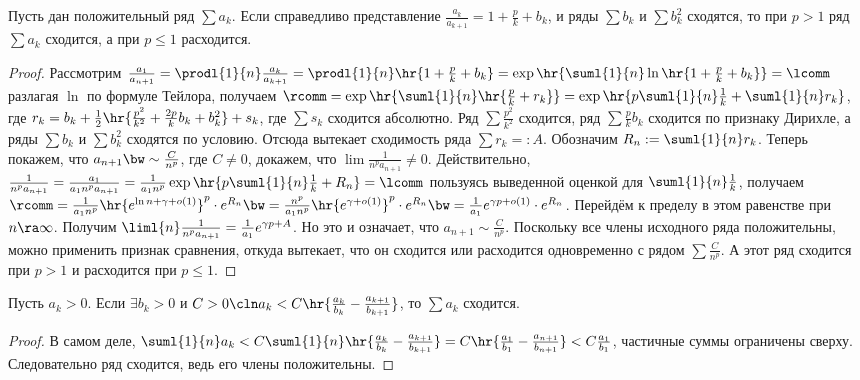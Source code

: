 \documentclass[a4paper]{article}
\begin{document}
\begin{theorem}
Пусть дан положительный ряд $\sum a_k$. Если справедливо представление $\frac{a_k}{a_{k+1}}=1+\frac{p}{k} + b_k$,
и ряды $\sum b_k$ и $\sum b_k^2$ сходятся, то при $p > 1$ ряд $\sum a_k$ сходится, а при $p \le 1$ расходится.
\end{theorem}
\begin{proof}
Рассмотрим $\frac{a_1}{a_{n+1}}= \prodl{1}{n} \frac{a_k}{a_{k+1}} = \prodl{1}{n}\hr{ 1+\frac{p}{k} + b_k } =
\exp \hr{ \suml{1}{n} \ln \hr{ 1 + \frac{p}{k} + b_k }} = \lcomm$ разлагая $\ln$ по формуле Тейлора, получаем $\rcomm =
\exp \hr{ \suml{1}{n} \hr{ \frac{p}{k} + r_k }} = \exp \hr{ p\suml{1}{n} \frac{1}{k} + \suml{1}{n} r_k }$, где
$r_k = b_k + \frac{1}{2}\hr{\frac{p^2}{k^2} + \frac{2p}{k}b_k + b_k^2} + s_k$, где $\sum s_k$ сходится абсолютно. Ряд $\sum \frac{p^2}{k^2}$ сходится, ряд $\sum \frac{p}{k}b_k$ сходится по
признаку Дирихле, а ряды $\sum b_k$ и $\sum b_k^2$ сходятся по условию. Отсюда вытекает сходимость ряда $\sum r_k =: A$.
Обозначим $R_n := \suml{1}{n}r_k$.
Теперь покажем, что $a_{n+1} \bw\sim \frac{C}{n^p}$, где $C \neq 0$,  докажем, что $\lim \frac{1}{n^pa_{n+1}} \neq 0$. Действительно,
$\frac{1}{n^p a_{n+1}}=\frac{a_1}{a_1n^p a_{n+1}}=\frac{1}{a_1n^p} \exp \hr{p\suml{1}{n}\frac{1}{k} + R_n} = \lcomm$
пользуясь выведенной оценкой для $\suml{1}{n} \frac{1}{k}$, получаем
$\rcomm = \frac{1}{a_1n^p}\hr{e^{\ln n + \gamma + o(1)}}^p \cdot e^{R_n} \bw= \frac{n^p}{a_1n^p} \hr{ e^{\gamma + o(1)}}^p
\cdot e^{R_n}\bw=\frac{1}{a_1}e^{\gamma p + o(1)}\cdot e^{R_n}$. Перейдём к пределу в этом равенстве при $n \ra \infty$. Получим
$\liml{n} \frac{1}{n^pa_{n+1}}= \frac{1}{a_1}e^{\gamma p+A}$. Но это и означает, что $a_{n+1} \sim \frac{C}{n^p}$. Поскольку все члены исходного ряда
положительны, можно применить признак сравнения, откуда вытекает, что он сходится или расходится одновременно с рядом $\sum \frac{C}{n^p}$.
А этот ряд сходится при $p > 1$ и расходится при $p \le 1$.
\end{proof}

\begin{theorem}
Пусть $a_k>0$. Если $\exi b_k>0$ и $C>0\cln a_k < C\hr{ \frac{a_k}{b_k}-\frac{a_{k+1}}{b_{k+1}}}$,
то $\sum a_k$ сходится.
\end{theorem}
\begin{proof}
В самом деле, $\suml{1}{n} a_k < C \suml{1}{n}\hr{ \frac{a_k}{b_k}-\frac{a_{k+1}}{b_{k+1}}} = C\hr{ \frac{a_1}{b_1}-\frac{a_{n+1}}{b_{n+1}}}
< C\frac{a_1}{b_1}$,  частичные суммы ограничены сверху. Следовательно ряд сходится, ведь его члены положительны.
\end{proof}
\end{document}
